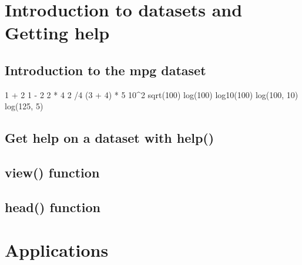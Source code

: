 \documentclass[
]{book}
\newenvironment{Shaded}{\begin{snugshade}}{\end{snugshade}}
\newcommand{\DecValTok}[1]{\textcolor[rgb]{0.00,0.00,0.81}{#1}}
\newcommand{\FunctionTok}[1]{\textcolor[rgb]{0.00,0.00,0.00}{#1}}
\newcommand{\NormalTok}[1]{#1}
\newcommand{\SpecialCharTok}[1]{\textcolor[rgb]{0.00,0.00,0.00}{#1}}
\begin{document}
\hypertarget{introduction-to-datasets-and-getting-help}{%
\chapter{Introduction to datasets and Getting help}\label{introduction-to-datasets-and-getting-help}}

\hypertarget{introduction-to-the-mpg-dataset}{%
\section{Introduction to the mpg dataset}\label{introduction-to-the-mpg-dataset}}

\begin{Shaded}
\begin{Highlighting}[]
\DecValTok{1} \SpecialCharTok{+} \DecValTok{2}
\DecValTok{1} \SpecialCharTok{{-}} \DecValTok{2}
\DecValTok{2} \SpecialCharTok{*} \DecValTok{4}
\DecValTok{2} \SpecialCharTok{/}\DecValTok{4}
\NormalTok{(}\DecValTok{3} \SpecialCharTok{+} \DecValTok{4}\NormalTok{) }\SpecialCharTok{*} \DecValTok{5}
\DecValTok{10}\SpecialCharTok{\^{}}\DecValTok{2}
\FunctionTok{sqrt}\NormalTok{(}\DecValTok{100}\NormalTok{)}
\FunctionTok{log}\NormalTok{(}\DecValTok{100}\NormalTok{)}
\FunctionTok{log10}\NormalTok{(}\DecValTok{100}\NormalTok{)}
\FunctionTok{log}\NormalTok{(}\DecValTok{100}\NormalTok{, }\DecValTok{10}\NormalTok{)}
\FunctionTok{log}\NormalTok{(}\DecValTok{125}\NormalTok{, }\DecValTok{5}\NormalTok{)}
\end{Highlighting}
\end{Shaded}

\hypertarget{get-help-on-a-dataset-with-help}{%
\section{Get help on a dataset with help()}\label{get-help-on-a-dataset-with-help}}

\hypertarget{view-function}{%
\section{view() function}\label{view-function}}

\hypertarget{head-function}{%
\section{head() function}\label{head-function}}

\hypertarget{applications}{%
\chapter{Applications}\label{applications}}
\end{document}
